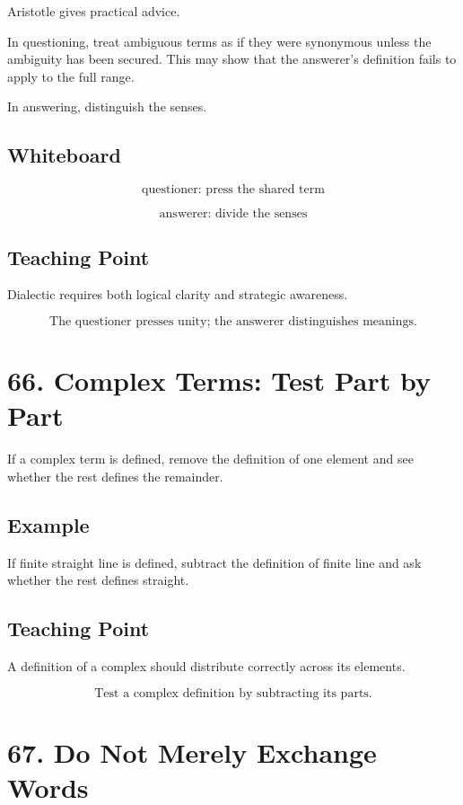 \documentclass[12pt]{article}
\begin{document}
Aristotle gives practical advice.

In questioning, treat ambiguous terms as if they were synonymous unless the
ambiguity has been secured. This may show that the answerer's definition fails
to apply to the full range.

In answering, distinguish the senses.

\subsection*{Whiteboard}

\[
\text{questioner: press the shared term}
\]

\[
\text{answerer: divide the senses}
\]

\subsection*{Teaching Point}

Dialectic requires both logical clarity and strategic awareness.

\[
\boxed{
\text{The questioner presses unity; the answerer distinguishes meanings.}
}
\]

\section*{66. Complex Terms: Test Part by Part}

If a complex term is defined, remove the definition of one element and see
whether the rest defines the remainder.

\subsection*{Example}

If finite straight line is defined, subtract the definition of finite line and
ask whether the rest defines straight.

\subsection*{Teaching Point}

A definition of a complex should distribute correctly across its elements.

\[
\boxed{
\text{Test a complex definition by subtracting its parts.}
}
\]

\section*{67. Do Not Merely Exchange Words}
\end{document}
